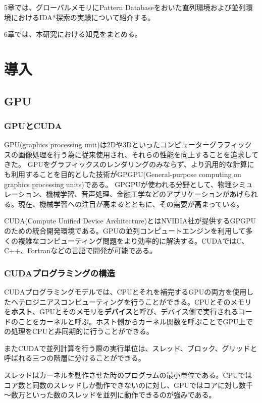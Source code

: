 \documentclass[a4paper,11pt,oneside,openany]{jsbook}
\begin{document}
5章では、グローバルメモリにPattern Databaseをおいた直列環境および並列環境におけるIDA*探索の実験について紹介する。

6章では、本研究における知見をまとめる。

\chapter{導入}
\section{GPU}
\subsection{GPUとCUDA}
GPU(graphics processing unit)は2Dや3Dといったコンピューターグラフィックスの画像処理を行う為に従来使用され、それらの性能を向上することを追求してきた。
GPUをグラフィックスのレンダリングのみならず、より汎用的な計算にも利用することを目的とした技術がGPGPU(General-purpose computing on graphics processing units)である。
GPGPUが使われる分野として、物理シミュレーション、機械学習、音声処理、金融工学などのアプリケーションがあげられる。現在、機械学習への注目が高まるとともに、その需要が高まっている。

CUDA(Compute Unified Device Architecture)とはNVIDIA社が提供するGPGPUのための統合開発環境である。GPUの並列コンピュートエンジンを利用して多くの複雑なコンピューティング問題をより効率的に解決する。CUDAではC、C++、Fortranなどの言語で開発が可能である。

\subsection{CUDAプログラミングの構造}
CUDAプログラミングモデルでは、CPUとそれを補完するGPUの両方を使用したヘテロジニアスコンピューティングを行うことができる。CPUとそのメモリを{\bf ホスト}、GPUとそのメモリを{\bf デバイス}と呼び、デバイス側で実行されるコードのことをカーネルと呼ぶ。ホスト側からカーネル関数を呼ぶことでGPU上での処理をCPUと非同期的に行うことができる。

またCUDAで並列計算を行う際の実行単位は、スレッド、ブロック、グリッドと呼ばれる三つの階層に分けることができる。

スレッドはカーネルを動作させた時のプログラムの最小単位である。CPUではコア数と同数のスレッドしか動作できないのに対し、GPUではコアに対し数千～数万といった数のスレッドを並列に動作できるのが強みである。
\end{document}
